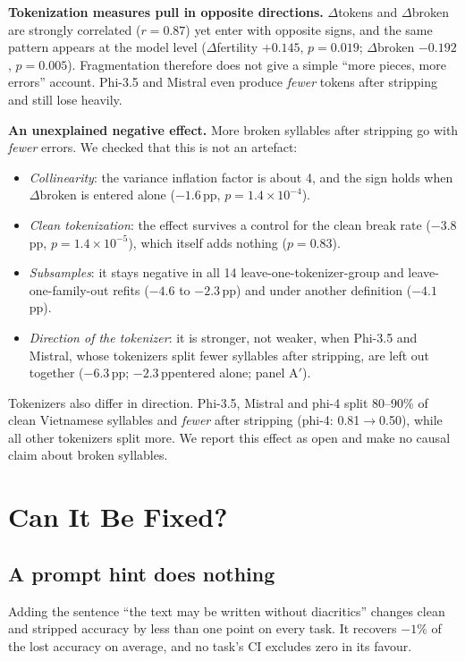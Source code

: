 \documentclass[conference]{IEEEtran}
\newcommand{\pp}{\,pp}
\begin{document}
\textbf{Tokenization measures pull in opposite directions.} $\Delta$tokens and $\Delta$broken are strongly correlated ($r = 0.87$) yet enter with opposite signs, and the same pattern appears at the model level ($\Delta$fertility $+0.145$, $p = 0.019$; $\Delta$broken $-0.192$, $p = 0.005$). Fragmentation therefore does not give a simple ``more pieces, more errors'' account. Phi-3.5 and Mistral even produce \emph{fewer} tokens after stripping and still lose heavily.

\textbf{An unexplained negative effect.} More broken syllables after stripping go with \emph{fewer} errors. We checked that this is not an artefact:
\begin{itemize}
\item \emph{Collinearity}: the variance inflation factor is about 4, and the sign holds when $\Delta$broken is entered alone ($-1.6$\pp, $p = 1.4\times10^{-4}$).
\item \emph{Clean tokenization}: the effect survives a control for the clean break rate ($-3.8$\pp, $p = 1.4\times10^{-5}$), which itself adds nothing ($p = 0.83$).
\item \emph{Subsamples}: it stays negative in all 14 leave-one-tokenizer-group and leave-one-family-out refits ($-4.6$ to $-2.3$\pp) and under another definition ($-4.1$\pp).
\item \emph{Direction of the tokenizer}: it is stronger, not weaker, when Phi-3.5 and Mistral, whose tokenizers split fewer syllables after stripping, are left out together ($-6.3$\pp; $-2.3$\pp entered alone; panel A$'$).
\end{itemize}
Tokenizers also differ in direction. Phi-3.5, Mistral and phi-4 split 80--90\% of clean Vietnamese syllables and \emph{fewer} after stripping (phi-4: 0.81$\rightarrow$0.50), while all other tokenizers split more. We report this effect as open and make no causal claim about broken syllables.

\section{Can It Be Fixed?}\label{sec:fix}

\subsection{A prompt hint does nothing}
Adding the sentence ``the text may be written without diacritics'' changes clean and stripped accuracy by less than one point on every task. It recovers $-1\%$ of the lost accuracy on average, and no task's CI excludes zero in its favour.
\end{document}
